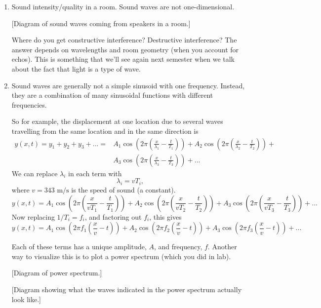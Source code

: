 \begin{enumerate}
\item Sound intensity/quality in a room. Sound waves are not one-dimensional.

[Diagram of sound waves coming from speakers in a room.] \nopagebreak
\vspace{5cm}

Where do you get constructive interference? Destructive interference? The answer depends on wavelengths and room geometry (when you account for echos). This is something that we'll see again next semester when we talk about the fact that light is a type of wave.



\item Sound waves are generally not a simple sinusoid with one frequency. Instead, they are a combination of many sinusoidal functions with different frequencies.

So for example, the displacement at one location due to several waves travelling from the same location and in the same direction is
\begin{align*}
  y(x,t)= y_1+y_2+y_3+...= & A_1\cos\left(2\pi\left(\frac{x}{\lambda_1}-\frac{t}{T_1}\right)\right) + A_2\cos\left(2\pi\left(\frac{x}{\lambda_2}-\frac{t}{T_2}\right)\right) + \\
  & A_3\cos\left(2\pi\left(\frac{x}{\lambda_3}-\frac{t}{T_3}\right)\right)+...
  \end{align*}
We can replace $\lambda_i$ in each term with
$$\lambda_i=vT_i,$$
where $v=343\mbox{ m/s}$ is the speed of sound (a constant).
$$y(x,t)=A_1\cos\left(2\pi\left(\frac{x}{vT_1}-\frac{t}{T_1}\right)\right) + A_2\cos\left(2\pi\left(\frac{x}{vT_2}-\frac{t}{T_2}\right)\right) + A_3\cos\left(2\pi\left(\frac{x}{vT_3}-\frac{t}{T_3}\right)\right)+...$$
Now replacing $1/T_i=f_i$, and factoring out $f_i$, this gives
$$y(x,t)=A_1\cos\left(2\pi f_1\left(\frac{x}{v}-t\right)\right) + A_2\cos\left(2\pi f_2\left(\frac{x}{v}-t\right)\right) + A_3\cos\left(2\pi f_3\left(\frac{x}{v}-t\right)\right)+...$$

Each of these terms has a unique amplitude, $A$, and frequency, $f$. Another way to visualize this is to plot a power spectrum (which you did in lab).

[Diagram of power spectrum.]\nopagebreak
\vspace{5cm}

[Diagram showing what the waves indicated in the power spectrum actually look like.] \nopagebreak
\vspace{5cm}



\end{enumerate}
